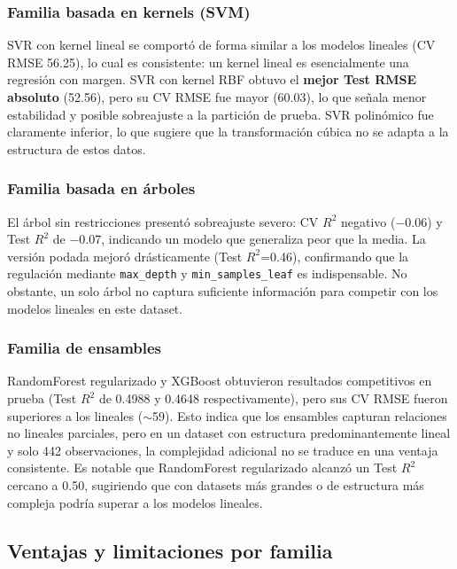 \documentclass[12pt,letterpaper]{article}
\begin{document}
\subsubsection{Familia basada en kernels (SVM)}
SVR con kernel lineal se comportó de forma similar a los modelos lineales (CV RMSE 56.25), lo cual es consistente: un kernel lineal es esencialmente una regresión con margen. SVR con kernel RBF obtuvo el \textbf{mejor Test RMSE absoluto} (52.56), pero su CV RMSE fue mayor (60.03), lo que señala menor estabilidad y posible sobreajuste a la partición de prueba. SVR polinómico fue claramente inferior, lo que sugiere que la transformación cúbica no se adapta a la estructura de estos datos.

\subsubsection{Familia basada en árboles}
El árbol sin restricciones presentó sobreajuste severo: CV $R^2$ negativo ($-$0.06) y Test $R^2$ de $-$0.07, indicando un modelo que generaliza peor que la media. La versión podada mejoró drásticamente (Test $R^2$=0.46), confirmando que la regulación mediante \texttt{max\_depth} y \texttt{min\_samples\_leaf} es indispensable. No obstante, un solo árbol no captura suficiente información para competir con los modelos lineales en este dataset.

\subsubsection{Familia de ensambles}
RandomForest regularizado y XGBoost obtuvieron resultados competitivos en prueba (Test $R^2$ de 0.4988 y 0.4648 respectivamente), pero sus CV RMSE fueron superiores a los lineales ($\sim$59). Esto indica que los ensambles capturan relaciones no lineales parciales, pero en un dataset con estructura predominantemente lineal y solo 442 observaciones, la complejidad adicional no se traduce en una ventaja consistente. Es notable que RandomForest regularizado alcanzó un Test $R^2$ cercano a 0.50, sugiriendo que con datasets más grandes o de estructura más compleja podría superar a los modelos lineales.

\subsection{Ventajas y limitaciones por familia}
\end{document}
